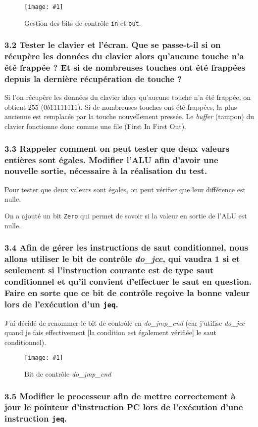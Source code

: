 \documentclass[twoside, 12pt, a4paper]{article}
\newcommand{\cf}[3]{
    \begin{figure}[!hbt]
        \centering
        \texttt{[image: \#1]}
    \caption{#3}\label{Fig:#1}
    \end{figure}
}
\newcommand{\hcf}[2]{\cf{#1}{.75}{#2}}
\begin{document}
\hcf{in_out.png}{Gestion des bits de contrôle \texttt{in} et \texttt{out}.}

        \subsubsection*{\textbf{3.2} Tester le clavier et l'écran. Que se passe-t-il si on récupère les données du clavier alors qu'aucune touche n'a été frappée ? Et si de nombreuses touches ont été frappées depuis la dernière récupération de touche ?}

Si l'on récupère les données du clavier alors qu'aucune touche n'a été frappée, on obtient $255$ ($0b11111111$).
Si de nombreuses touches ont été frappées, la plus ancienne est remplacée par la touche nouvellement pressée.
Le \textit{buffer} (tampon) du clavier fonctionne donc comme une file (First In First Out).

        \subsubsection*{\textbf{3.3} Rappeler comment on peut tester que deux valeurs entières sont égales. Modifier l'ALU afin d'avoir une nouvelle sortie, nécessaire à la réalisation du test.}

Pour tester que deux valeurs sont égales, on peut vérifier que leur différence est nulle.

On a ajouté un bit \texttt{Zero} qui permet de savoir si la valeur en sortie de l'ALU est nulle.

        \subsubsection*{\textbf{3.4} Afin de gérer les instructions de saut conditionnel, nous allons utiliser le bit de contrôle \textit{do\_jcc}, qui vaudra 1 si et seulement si l'instruction courante est de type saut conditionnel et qu'il convient d'effectuer le saut en question. \\
        Faire en sorte que ce bit de contrôle reçoive la bonne valeur lors de l'exécution d'un \texttt{jeq}.}

J'ai décidé de renommer le bit de contrôle en \textit{do\_jmp\_cnd} (car j'utilise \textit{do\_jcc} quand je fais effectivement [la condition est également vérifiée] le saut conditionnel).

\hcf{do_jmp_cnd.png}{Bit de contrôle \textit{do\_jmp\_cnd}}

        \subsubsection*{\textbf{3.5} Modifier le processeur afin de mettre correctement à jour le pointeur d'instruction PC lors de l'exécution d'une instruction \texttt{jeq}.}
\end{document}
